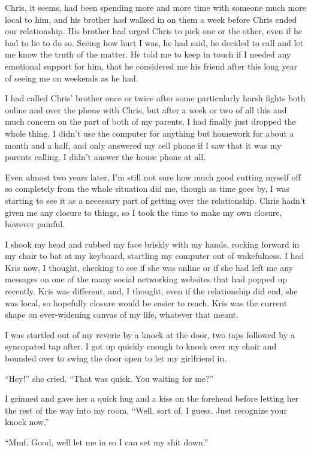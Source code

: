 Chris, it seems, had been spending more and more time with someone much more local to him, and his brother had walked in on them a week before Chris ended our relationship.  His brother had urged Chris to pick one or the other, even if he had to lie to do so.  Seeing how hurt I was, he had said, he decided to call and let me know the truth of the matter.  He told me to keep in touch if I needed any emotional support for him, that he considered me his friend after this long year of seeing me on weekends as he had.

I had called Chris' brother once or twice after some particularly harsh fights both online and over the phone with Chris, but after a week or two of all this and much concern on the part of both of my parents, I had finally just dropped the whole thing.  I didn't use the computer for anything but homework for about a month and a half, and only answered my cell phone if I saw that it was my parents calling.  I didn't answer the house phone at all.

Even almost two years later, I'm still not sure how much good cutting myself off so completely from the whole situation did me, though as time goes by, I was starting to see it as a necessary part of getting over the relationship.  Chris hadn't given me any closure to things, so I took the time to make my own closure, however painful.

I shook my head and rubbed my face briskly with my hands, rocking forward in my chair to bat at my keyboard, startling my computer out of wakefulness.  I had Kris now, I thought, checking to see if she was online or if she had left me any messages on one of the many social networking websites that had popped up recently.  Kris was different, and, I thought, even if the relationship did end, she was local, so hopefully closure would be easier to reach.  Kris was the current shape on ever-widening canvas of my life, whatever that meant.

I was startled out of my reverie by a knock at the door, two taps followed by a syncopated tap after.  I got up quickly enough to knock over my chair and bounded over to swing the door open to let my girlfriend in.

``Hey!'' she cried.  ``That was quick.  You waiting for me?''

I grinned and gave her a quick hug and a kiss on the forehead before letting her the rest of the way into my room, ``Well, sort of, I guess.  Just recognize your knock now.''

``Mmf.  Good, well let me in so I can set my shit down.''

